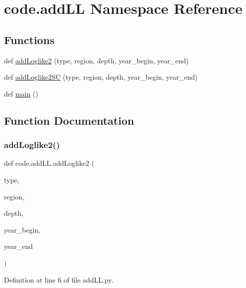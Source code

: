 \hypertarget{namespacecode_1_1add_l_l}{}\section{code.\+add\+LL Namespace Reference}
\label{namespacecode_1_1add_l_l}
\subsection*{Functions}
\begin{DoxyCompactItemize}
\item 
def \hyperlink{namespacecode_1_1add_l_l_a9c471023777b6f7b2593ed3143f1e9c8}{add\+Loglike2} (type, region, depth, year\+\_\+begin, year\+\_\+end)
\item 
def \hyperlink{namespacecode_1_1add_l_l_ac3e16cc60c2ed2b4aec99176c5e4687f}{add\+Loglike2\+SC} (type, region, depth, year\+\_\+begin, year\+\_\+end)
\item 
def \hyperlink{namespacecode_1_1add_l_l_a03f8b179b69e620c74d5c55fd97cbf41}{main} ()
\end{DoxyCompactItemize}


\subsection{Function Documentation}
\mbox{\label{namespacecode_1_1add_l_l_a9c471023777b6f7b2593ed3143f1e9c8}} 
\subsubsection{\texorpdfstring{add\+Loglike2()}{addLoglike2()}}
{\footnotesize\ttfamily def code.\+add\+L\+L.\+add\+Loglike2 (\begin{DoxyParamCaption}\item[{}]{type,  }\item[{}]{region,  }\item[{}]{depth,  }\item[{}]{year\+\_\+begin,  }\item[{}]{year\+\_\+end }\end{DoxyParamCaption})}



Definition at line 6 of file add\+L\+L.\+py.

\mbox{\label{namespacecode_1_1add_l_l_ac3e16cc60c2ed2b4aec99176c5e4687f}} 
